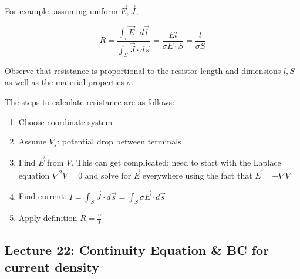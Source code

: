 \documentclass[10pt]{article}
\begin{document}
\begin{example}
	For example, assuming uniform $ \vec{E}, \vec{J}  $,

	\begin{equation}
		R= \frac{\int_l \vec{E} \cdot  d \vec{l}}{\int_S \vec{J} \cdot d\vec{s}} = \frac{El}{\sigma E \cdot S } = \frac{l}{\sigma S}
	\end{equation}

	Observe that resistance is proportional to the resistor length and dimensions $ l, S $ as well as the material properties $ \sigma $. 

\end{example}


The steps to calculate resistance are as follows:


\begin{enumerate}
	\item Choose coordinate system
	\item Assume $ V_s $: potential drop between terminals
	\item Find $ \vec{E} $  from $ V $. This can get complicated; need to start with the Laplace equation $ \nabla ^2 V = 0 $ and solve for $ \vec{E} $ everywhere using the fact that $ \vec{E} = - \nabla V $ 
	\item Find current: $ I = \int_S \vec{J} \cdot d \vec{s} = \int_S \sigma \vec{E} \cdot  d \vec{s} $ 
	\item Apply definition $ R = \frac{V}{I} $ 

\end{enumerate}




\subsection{Lecture 22: Continuity Equation \& BC for current density}
\end{document}

